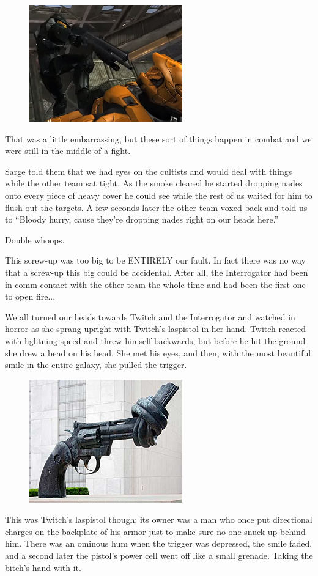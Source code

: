 \begin{figure}
	\begin{center}
		\includegraphics[width=\figwidth]{pics/5/21.png}
	\end{center}
\end{figure}
That was a little embarrassing, but these sort of things happen in combat and we were still in the middle of a fight. 

Sarge told them that we had eyes on the cultists and would deal with things while the other team sat tight. 
As the smoke cleared he started dropping nades onto every piece of heavy cover he could see while the rest of us waited for him to flush out the targets. 
A few seconds later the other team voxed back and told us to “Bloody hurry, cause they’re dropping nades right on our heads here.”

Double whoops.

This screw-up was too big to be ENTIRELY our fault. 
In fact there was no way that a screw-up this big could be accidental. 
After all, the Interrogator had been in comm contact with the other team the whole time and had been the first one to open fire...

We all turned our heads towards Twitch and the Interrogator and watched in horror as she sprang upright with Twitch’s laspistol in her hand. 
Twitch reacted with lightning speed and threw himself backwards, but before he hit the ground she drew a bead on his head. 
She met his eyes, and then, with the most beautiful smile in the entire galaxy, she pulled the trigger.

\begin{figure}
	\begin{center}
		\includegraphics[width=\figwidth]{pics/5/22.png}
	\end{center}
\end{figure}
This was Twitch’s laspistol though; 
its owner was a man who once put directional charges on the backplate of his armor just to make sure no one snuck up behind him. 
There was an ominous hum when the trigger was depressed, the smile faded, and a second later the pistol’s power cell went off like a small grenade.
Taking the bitch’s hand with it.


